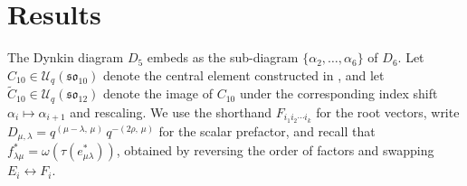 \documentclass{ximera}
\newcommand{\so}{\mathfrak{so}}
\newcommand{\Uq}{\mathcal{U}_q}
\begin{document}
\section{Results}\label{sec:results}

The Dynkin diagram $D_5$ embeds as the sub-diagram $\{\alpha_2, \ldots, \alpha_6\}$ of $D_6$. Let $C_{10} \in \Uq(\so_{10})$ denote the central element constructed in \cite{RohrSellakumaranYin}, and let $\widetilde{C}_{10} \in \Uq(\so_{12})$ denote the image of $C_{10}$ under the corresponding index shift $\alpha_i \mapsto \alpha_{i+1}$ and rescaling. We use the shorthand $F_{i_1 i_2 \cdots i_k}$ for the root vectors, write $D_{\mu,\lambda} = q^{(\mu-\lambda,\,\mu)}\,q^{-(2\rho,\,\mu)}$ for the scalar prefactor, and recall that $f^*_{\lambda\mu} = \omega(\tau(e^*_{\mu\lambda}))$, obtained by reversing the order of factors and swapping $E_i \leftrightarrow F_i$.
\end{document}
